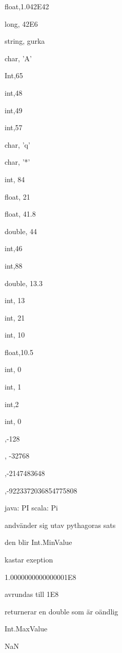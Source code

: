 \Subtask float,1.042E42

\Subtask long, 42E6

\Subtask string, gurka

\Subtask char, 'A'

\Subtask Int,65

\Subtask int,48

\Subtask int,49

\Subtask int,57

\Subtask  char, 'q'

\Subtask  char, '*'

\Task %
\Subtask  int, 84

\Subtask float, 21

\Subtask float, 41.8

\Subtask double, 44

\Task %
\Subtask int,46

\Subtask int,88

\Subtask double, 13.3

\Subtask int, 13

\Task %
\Subtask  int, 21

\Subtask  int, 10

\Subtask float,10.5

\Subtask int, 0

\Subtask int, 1

\Subtask int,2

\Subtask int, 0


\Task %
,-128

, -32768

,-2147483648

,-9223372036854775808

\Task %
\Subtask 
java: PI scala: Pi

\Subtask andvänder sig utav pythagoras sats

\Subtask 

\Task %
\Subtask den blir Int.MinValue

\Subtask kastar exeption

\Subtask 1.0000000000000001E8

\Subtask avrundas till 1E8


\Subtask returnerar en double som är oändlig

\Subtask Int.MaxValue

\Subtask NaN

